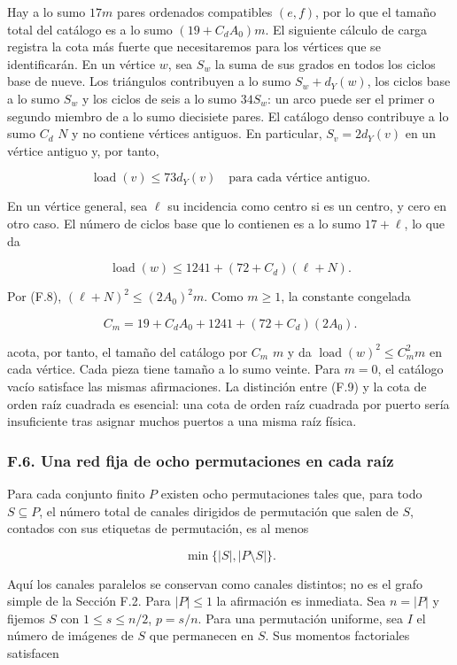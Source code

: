 \documentclass[spanish,11pt,a4paper]{article}
\begin{document}
Hay a lo sumo \(17m\) pares ordenados compatibles \((e,f)\), por lo que el tamaño total del catálogo es a lo sumo \((19+C_d A_0)m\). El siguiente cálculo de carga registra la cota más fuerte que necesitaremos para los vértices que se identificarán. En un vértice \(w\), sea \(S_{w}\) la suma de sus grados en todos los ciclos base de nueve. Los triángulos contribuyen a lo sumo \(S_{w}+d_{Y}(w)\), los ciclos base a lo sumo \(S_{w}\) y los ciclos de seis a lo sumo \(34S_{w}\): un arco puede ser el primer o segundo miembro de a lo sumo diecisiete pares. El catálogo denso contribuye a lo sumo \(C_{d}\) \(N\) y no contiene vértices antiguos. En particular, \(S_{v}=2d_{Y}(v)\) en un vértice antiguo y, por tanto,

\[\operatorname{load}(v)\le73d_Y(v)\quad\text{para cada vértice antiguo}.\tag{F.9}\]

En un vértice general, sea \(\ell\) su incidencia como centro si es un centro, y cero en otro caso. El número de ciclos base que lo contienen es a lo sumo \(17+\ell\), lo que da

\[\operatorname{load}(w)\le1241+(72+C_d)(\ell+N).\]

Por (F.8), \((\ell+N)^2\le(2A_0)^2m\). Como \(m\ge 1\), la constante congelada

\[C_m=19+C_dA_0+1241+(72+C_d)(2A_0).\tag{F.10}\]

acota, por tanto, el tamaño del catálogo por \(C_{m}\) \(m\) y da \(\operatorname{load}(w)^2\le C_m^2m\) en cada vértice. Cada pieza tiene tamaño a lo sumo veinte. Para \(m=0\), el catálogo vacío satisface las mismas afirmaciones. La distinción entre (F.9) y la cota de orden raíz cuadrada es esencial: una cota de orden raíz cuadrada por puerto sería insuficiente tras asignar muchos puertos a una misma raíz física.

\subsubsection{F.6. Una red fija de ocho permutaciones en cada raíz}\label{f.6.-una-red-fija-de-ocho-permutaciones-en-cada-rauxedz}

Para cada conjunto finito \(P\) existen ocho permutaciones tales que, para todo \(S\subseteq P\), el número total de canales dirigidos de permutación que salen de \(S\), contados con sus etiquetas de permutación, es al menos

\[\min\{|S|,|P\setminus S|\}.\tag{F.11}\]

Aquí los canales paralelos se conservan como canales distintos; no es el grafo simple de la Sección F.2. Para \(|P|\le 1\) la afirmación es inmediata. Sea \(n=|P|\) y fijemos \(S\) con \(1\le s\le n/2\), \(p=s/n\). Para una permutación uniforme, sea \(I\) el número de imágenes de \(S\) que permanecen en \(S\). Sus momentos factoriales satisfacen
\end{document}
